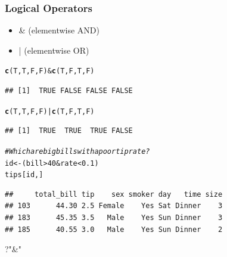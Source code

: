\documentclass{beamer}\usepackage[]{graphicx}\usepackage[]{color}
\makeatletter
\newcommand{\hlnum}[1]{\textcolor[rgb]{0.686,0.059,0.569}{#1}}%
\newcommand{\hlcom}[1]{\textcolor[rgb]{0.678,0.584,0.686}{\textit{#1}}}%
\newcommand{\hlopt}[1]{\textcolor[rgb]{0,0,0}{#1}}%
\newcommand{\hlstd}[1]{\textcolor[rgb]{0.345,0.345,0.345}{#1}}%
\newcommand{\hlkwb}[1]{\textcolor[rgb]{0.69,0.353,0.396}{#1}}%
\newcommand{\hlkwd}[1]{\textcolor[rgb]{0.737,0.353,0.396}{\textbf{#1}}}%
\newenvironment{kframe}{%
 \def\at@end@of@kframe{}%
 \ifinner\ifhmode%
  \def\at@end@of@kframe{\end{minipage}}%
  \begin{minipage}{\columnwidth}%
 \fi\fi%
 \def\FrameCommand##1{\hskip\@totalleftmargin \hskip-\fboxsep
 \colorbox{shadecolor}{##1}\hskip-\fboxsep
     \hskip-\linewidth \hskip-\@totalleftmargin \hskip\columnwidth}%
 \MakeFramed {\advance\hsize-\width
   \@totalleftmargin\z@ \linewidth\hsize
   \@setminipage}}%
 {\par\unskip\endMakeFramed%
 \at@end@of@kframe}
\newenvironment{knitrout}{}{} %
\makeatother
\begin{document}
\begin{frame}[fragile]
    \frametitle{Logical Operators}
    \begin{itemize}
        \item \& (elementwise AND)
        \item | (elementwise OR)
    \end{itemize}

\begin{knitrout}\footnotesize
{}\color{fgcolor}\begin{kframe}
\begin{alltt}
\hlkwd{c}\hlstd{(T, T, F, F)} \hlopt{&} \hlkwd{c}\hlstd{(T, F, T, F)}
\end{alltt}
\begin{verbatim}
## [1]  TRUE FALSE FALSE FALSE
\end{verbatim}
\begin{alltt}
\hlkwd{c}\hlstd{(T, T, F, F)} \hlopt{|} \hlkwd{c}\hlstd{(T, F, T, F)}
\end{alltt}
\begin{verbatim}
## [1]  TRUE  TRUE  TRUE FALSE
\end{verbatim}
\begin{alltt}
\hlcom{# Which are big bills with a poor tip rate?}
\hlstd{id} \hlkwb{<-} \hlstd{(bill} \hlopt{>} \hlnum{40} \hlopt{&} \hlstd{rate} \hlopt{<} \hlnum{0.1}\hlstd{)}
\hlstd{tips[id, ]}
\end{alltt}
\begin{verbatim}
##     total_bill tip    sex smoker day   time size
## 103      44.30 2.5 Female    Yes Sat Dinner    3
## 183      45.35 3.5   Male    Yes Sun Dinner    3
## 185      40.55 3.0   Male    Yes Sun Dinner    2
\end{verbatim}
\end{kframe}
\end{knitrout}


?"\&"

\end{frame}



\end{document}
